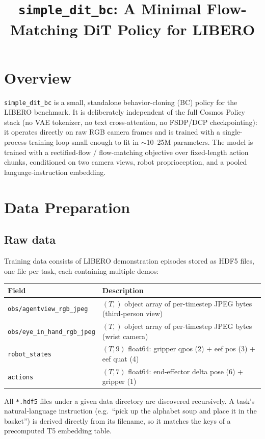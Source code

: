 \documentclass[11pt]{article}
\title{\texttt{simple\_dit\_bc}: A Minimal Flow-Matching DiT Policy for LIBERO}
\author{}
\date{}
\begin{document}
\maketitle

\section{Overview}

\texttt{simple\_dit\_bc} is a small, standalone behavior-cloning (BC) policy for the LIBERO
benchmark. It is deliberately independent of the full Cosmos Policy stack (no VAE tokenizer, no
text cross-attention, no FSDP/DCP checkpointing): it operates directly on raw RGB camera frames
and is trained with a single-process training loop small enough to fit in $\sim$10--25M
parameters. The model is trained with a rectified-flow / flow-matching objective over
fixed-length action chunks, conditioned on two camera views, robot proprioception, and a
pooled language-instruction embedding.

\section{Data Preparation}

\subsection{Raw data}

Training data consists of LIBERO demonstration episodes stored as HDF5 files, one file per task,
each containing multiple demos:
\begin{center}
\begin{tabular}{ll}
\toprule
Field & Description \\
\midrule
\texttt{obs/agentview\_rgb\_jpeg} & $(T,)$ object array of per-timestep JPEG bytes (third-person view) \\
\texttt{obs/eye\_in\_hand\_rgb\_jpeg} & $(T,)$ object array of per-timestep JPEG bytes (wrist camera) \\
\texttt{robot\_states} & $(T, 9)$ float64: gripper qpos (2) + eef pos (3) + eef quat (4) \\
\texttt{actions} & $(T, 7)$ float64: end-effector delta pose (6) + gripper (1) \\
\bottomrule
\end{tabular}
\end{center}

All \texttt{*.hdf5} files under a given data directory are discovered recursively. A task's
natural-language instruction (e.g.\ ``pick up the alphabet soup and place it in the basket'') is
derived directly from its filename, so it matches the keys of a precomputed T5 embedding table.
\end{document}
